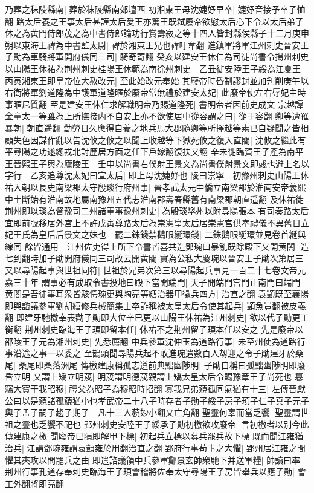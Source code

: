 乃葬之秣陵縣南|{
	葬於秣陵縣南郊壇西}
初湘東王母沈婕妤早卒|{
	婕妤音接予卒子恤翻}
路太后養之王事太后甚謹太后愛王亦篤王既弑廢帝欲慰太后心下令以太后弟子休之為黄門侍郎茂之為中書侍郎論功行賞壽寂之等十四人皆封縣侯縣子十二月庚申朔以東海王禕為中書監太尉|{
	禕於湘東王兄也禕吁韋翻}
進鎮軍將軍江州刺史晉安王子勛為車騎將軍開府儀同三司|{
	騎奇寄翻}
癸亥以建安王休仁為司徒尚書令揚州刺史以山陽王休祐為荆州刺史桂陽王休範為南徐州刺史　乙丑徙安陸王子綏為江夏王　丙寅湘東王即皇帝位大赦改元|{
	至此始改元奉始}
其廢帝時昏制謬封並加刋削庚午以右衛將軍劉道隆為中護軍道隆暱於廢帝常無禮於建安太妃|{
	此廢帝使左右辱妃主時事暱尼質翻}
至是建安王休仁求解職明帝乃賜道隆死|{
	書明帝者因前史成文}
宗越譚金童太一等雖為上所撫接内不自安上亦不欲使居中從容謂之曰|{
	從于容翻}
卿等遭罹暴朝|{
	朝直遥翻}
勤勞日久應得自養之地兵馬大郡隨卿等所擇越等素已自疑聞之皆相顧失色因謀作亂以告沈攸之攸之以聞上收越等下獄死攸之復入直閤|{
	沈攸之繼此有平尋陽之功遂總戎北討歷居方面之任下戶嫁翻復扶又翻}
辛未徙臨賀王子產為南平王晉熙王子輿為廬陵王　壬申以尚書右僕射王景文為尚書僕射景文即彧也避上名以字行　乙亥追尊沈太妃曰宣太后|{
	即上母沈婕妤也}
陵曰崇寧　初豫州刺史山陽王休祐入朝以長史南梁郡太守殷琰行府州事|{
	晉孝武太元中僑立南梁郡於淮南安帝義熙中土斷始有淮南故地屬南豫州五代志淮南郡壽春縣舊有南梁郡朝直遥翻}
及休祐徙荆州即以琰為督豫司二州諸軍事豫州刺史|{
	為殷琰舉州以附尋陽張本}
有司奏路太后宜即前號移居外宮上不許戊寅尊路太后為崇憲皇太后居崇憲宫供奉禮儀不異舊日立妃王氏為皇后后景文之妹也　罷二銖錢禁鵝眼綖環錢|{
	二銖鵝眼綖環並見卷首綖與線同}
餘皆通用　江州佐吏得上所下令書皆喜共造鄧琬曰暴亂既除殿下又開黄閤|{
	造七到翻時加子勛開府儀同三司故云開黄閤}
實為公私大慶琬以晉安王子勛次第居三又以尋陽起事與世祖同符|{
	世祖於兄弟次第三以尋陽起兵事見一百二十七卷文帝元嘉三十年}
謂事必有成取令書投地曰殿下當開端門|{
	天子開端門宫門正南門曰端門}
黄閤是吾徒事耳衆皆駭愕琬更與陶亮等繕治器甲徵兵四方|{
	治直之翻}
袁顗既至襄陽即與諮議參軍劉胡繕修兵械簡集士卒詐稱被太皇太后令使其起兵|{
	顗魚豈翻被皮義翻}
即建牙馳檄奉表勸子勛即大位辛巳更以山陽王休祐為江州刺史|{
	欲以代子勛更工衡翻}
荆州刺史臨海王子頊即留本任|{
	休祐不之荆州留子頊本任以安之}
先是廢帝以邵陵王子元為湘州刺史|{
	先悉薦翻}
中兵參軍沈仲玉為道路行事|{
	未至州使為道路行事沿途之事一以委之}
至鵲頭聞尋陽兵起不敢進琬遣數百人刼迎之令子勛建牙於桑尾|{
	桑尾即桑落洲尾}
傳檄建康稱孤志遵前典黜幽陟明|{
	子勛自稱曰孤黜幽陟明即廢昏立明}
又謂上矯立明荗|{
	明荗謂明德荗親謂上矯太皇太后令賜豫章王子尚死也}
簒竊大寶干我昭穆|{
	禮父為昭子為穆昭時招翻}
寡我兄弟藐孤同氣猶有十三|{
	左傳晉獻公曰以是藐諸孤藐猶小也孝武帝二十八子時存者子勛子綏子房子頊子仁子真子元子輿子孟子嗣子趨子期子　凡十三人藐妙小翻又亡角翻}
聖靈何辜而當乏饗|{
	聖靈謂世祖之靈也乏饗不祀也}
郢州刺史安陸王子綏承子勛初檄欲攻廢帝|{
	言初檄者以别今此傳建康之檄}
聞廢帝已隕即解甲下標|{
	初起兵立標以募兵罷兵故下標}
既而聞江雍猶治兵|{
	江謂鄧琬雍謂袁顗雍於用翻治直之翻}
郢府行事苟卞之大懼|{
	郢州居江雍之間懼其夾攻以問罷兵之由}
即遣諮議領中兵參軍鄭景玄帥衆馳下并送軍糧|{
	帥讀曰率}
荆州行事孔道存奉刺史臨海王子頊會稽將佐奉太守尋陽王子房皆舉兵以應子勛|{
	會工外翻將即亮翻}


